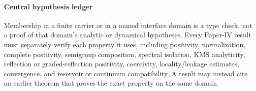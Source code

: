 \documentclass[12pt,a4paper]{article}
\begin{document}
\paragraph*{Central hypothesis ledger}
\label{p4:sec:central-proof-discharge-ledger}

\begin{proposition}
\label{p4:prop:central-proof-discharge}
Membership in a finite carrier or in a named interface domain is a type check,
not a proof of that domain's analytic or dynamical hypotheses.  Every
Paper-IV result must separately verify each property it uses, including
positivity, normalization, complete positivity, semigroup composition,
spectral isolation, KMS analyticity, reflection or graded-reflection
positivity, coercivity, locality/leakage estimates, convergence, and
reservoir or continuum compatibility.  A result may instead cite an earlier
theorem that proves the exact property on the same domain.
\end{proposition}
\end{document}
